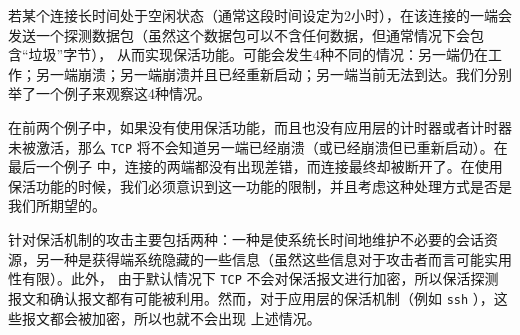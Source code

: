 若某个连接长时间处于空闲状态（通常这段时间设定为2小时），在该连接的一端会发送一个探测数据包（虽然这个数据包可以不含任何数据，但通常情况下会包含“垃圾”字节），
从而实现保活功能。可能会发生4种不同的情况：另一端仍在工作；另一端崩溃；另一端崩溃并且已经重新启动；另一端当前无法到达。我们分别举了一个例子来观察这4种情况。

在前两个例子中，如果没有使用保活功能，而且也没有应用层的计时器或者计时器未被激活，那么 \verb|TCP| 将不会知道另一端已经崩溃（或已经崩溃但已重新启动）。在最后一个例子
中，连接的两端都没有出现差错，而连接最终却被断开了。在使用保活功能的时候，我们必须意识到这一功能的限制，并且考虑这种处理方式是否是我们所期望的。

针对保活机制的攻击主要包括两种：一种是使系统长时间地维护不必要的会话资源，另一种是获得端系统隐藏的一些信息（虽然这些信息对于攻击者而言可能实用性有限）。此外，
由于默认情况下 \verb|TCP| 不会对保活报文进行加密，所以保活探测报文和确认报文都有可能被利用。然而，对于应用层的保活机制（例如 \verb|ssh| ），这些报文都会被加密，所以也就不会出现
上述情况。

